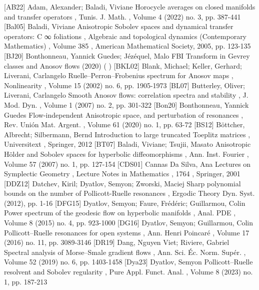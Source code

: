 [AB22] Adam, Alexander; Baladi, Viviane Horocycle averages on closed manifolds and transfer operators , Tunis. J. Math. , Volume 4 (2022) no. 3, pp. 387-441
 [Bal05] Baladi, Viviane Anisotropic Sobolev spaces and dynamical transfer operators: C ∞ foliations , Algebraic and topological dynamics (Contemporary Mathematics) , Volume 385 , American Mathematical Society, 2005, pp. 123-135
 [BJ20] Bonthonneau, Yannick Guedes; Jézéquel, Malo FBI Transform in Gevrey classes and Anosov flows (2020) ( )
 [BKL02] Blank, Michael; Keller, Gerhard; Liverani, Carlangelo Ruelle–Perron–Frobenius spectrum for Anosov maps , Nonlinearity , Volume 15 (2002) no. 6, pp. 1905-1973
 [BL07] Butterley, Oliver; Liverani, Carlangelo Smooth Anosov flows: correlation spectra and stability , J. Mod. Dyn. , Volume 1 (2007) no. 2, pp. 301-322
 [Bon20] Bonthonneau, Yannick Guedes Flow-independent Anisotropic space, and perturbation of resonances , Rev. Unión Mat. Argent. , Volume 61 (2020) no. 1, pp. 63-72
 [BS12] Böttcher, Albrecht; Silbermann, Bernd Introduction to large truncated Toeplitz matrices , Universitext , Springer, 2012
 [BT07] Baladi, Viviane; Tsujii, Masato Anisotropic Hölder and Sobolev spaces for hyperbolic diffeomorphisms , Ann. Inst. Fourier , Volume 57 (2007) no. 1, pp. 127-154
 [CDS01] Cannas Da Silva, Ana Lectures on Symplectic Geometry , Lecture Notes in Mathematics , 1764 , Springer, 2001
 [DDZ12] Datchev, Kiril; Dyatlov, Semyon; Zworski, Maciej Sharp polynomial bounds on the number of Pollicott-Ruelle resonances , Ergodic Theory Dyn. Syst. (2012), pp. 1-16
 [DFG15] Dyatlov, Semyon; Faure, Frédéric; Guillarmou, Colin Power spectrum of the geodesic flow on hyperbolic manifolds , Anal. PDE , Volume 8 (2015) no. 4, pp. 923-1000
 [DG16] Dyatlov, Semyon; Guillarmou, Colin Pollicott–Ruelle resonances for open systems , Ann. Henri Poincaré , Volume 17 (2016) no. 11, pp. 3089-3146
 [DR19] Dang, Nguyen Viet; Riviere, Gabriel Spectral analysis of Morse–Smale gradient flows , Ann. Sci. Éc. Norm. Supér. , Volume 52 (2019) no. 6, pp. 1403-1458
 [Dya23] Dyatlov, Semyon Pollicott–Ruelle resolvent and Sobolev regularity , Pure Appl. Funct. Anal. , Volume 8 (2023) no. 1, pp. 187-213
